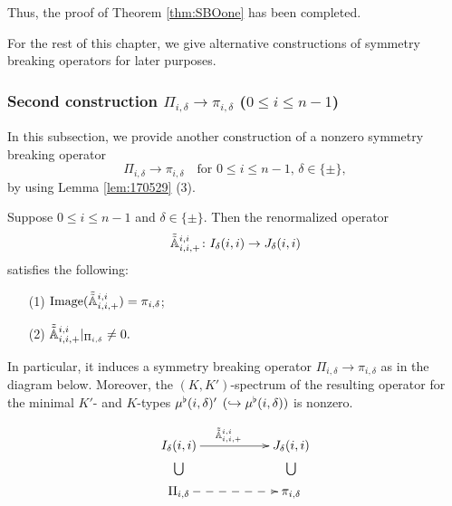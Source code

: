 Thus,
 the proof of Theorem \ref{thm:SBOone} has been completed.  

\vskip 1pc
For the rest of this chapter,
 we give alternative constructions
 of symmetry breaking operators for later purposes.  

\subsubsection{Second construction $\Pi_{i,\delta} \to \pi_{i,\delta}$
 ($0 \le i \le n-1$)}
\label{subsec:irrIJ}

In this subsection,
 we provide another construction
 of a nonzero symmetry breaking operator
\[
    \Pi_{i,\delta} \to \pi_{i,\delta}
   \quad
   \text{for $0 \le i \le n-1$, $\delta \in \{\pm\}$}, 
\]
by using Lemma \ref{lem:170529} (3).  
\begin{proposition}
\label{prop:SBOi4}
Suppose $0 \le i \le n-1$ and $\delta \in \{\pm\}$.  
Then the renormalized operator
\[
  \tilde{\tilde{{\mathbb{A}}}}_{{i},{i},{+}}^{{i,i}}\colon I_{\delta}(i,i) \to J_{\delta}(i,i)
\]
 satisfies the following:
\begin{enumerate}
\item[{\rm{(1)}}]
${\operatorname{Image}}(\tilde{\tilde{{\mathbb{A}}}}_{{i},{i},{+}}^{{i,i}})=\pi_{i,\delta}$;
\item[{\rm{(2)}}]
$\tilde{\tilde{{\mathbb{A}}}}_{{i},{i},{+}}^{{i,i}}|_{\Pi_{i,\delta}}\ne 0.$
\end{enumerate}
In particular,
 it induces a symmetry breaking operator
 $\Pi_{i,\delta} \to \pi_{i,\delta}$ 
 as in the diagram below.  
Moreover,
 the $(K,K')$-spectrum
 of the resulting operator 
 for the minimal $K'$- and $K$-types $\mu^{\flat} (i,\delta)'$
 $(\hookrightarrow \mu^{\flat}(i,\delta))$ is nonzero.  

\begin{eqnarray*}
\xymatrix@R=2pt{
I_{\delta}(i,i)\ar[rr]^{\Attbb {i}{i}+ {i,i}\quad}
&& J_{\delta}(i,i)
\\
\bigcup
&&\bigcup
\\
\Pi_{i,\delta}
\ar@{-->}[rr]
&&\pi_{i,\delta}
}
\end{eqnarray*}
\end{proposition}
